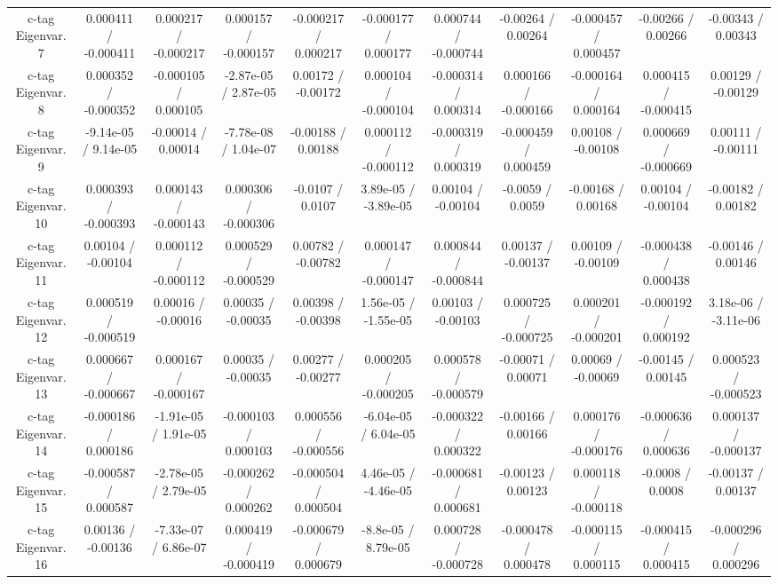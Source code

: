 {\begin{landscape}
\begin{longtable}{@{\extracolsep{\fill}}| *{11}{c|}}
  c-tag Eigenvar. 7 & 0.000411 / -0.000411 & 0.000217 / -0.000217 & 0.000157 / -0.000157 & -0.000217 / 0.000217 & -0.000177 / 0.000177 & 0.000744 / -0.000744 & -0.00264 / 0.00264 & -0.000457 / 0.000457 & -0.00266 / 0.00266 & -0.00343 / 0.00343 \\ 
  c-tag Eigenvar. 8 & 0.000352 / -0.000352 & -0.000105 / 0.000105 & -2.87e-05 / 2.87e-05 & 0.00172 / -0.00172 & 0.000104 / -0.000104 & -0.000314 / 0.000314 & 0.000166 / -0.000166 & -0.000164 / 0.000164 & 0.000415 / -0.000415 & 0.00129 / -0.00129 \\ 
  c-tag Eigenvar. 9 & -9.14e-05 / 9.14e-05 & -0.00014 / 0.00014 & -7.78e-08 / 1.04e-07 & -0.00188 / 0.00188 & 0.000112 / -0.000112 & -0.000319 / 0.000319 & -0.000459 / 0.000459 & 0.00108 / -0.00108 & 0.000669 / -0.000669 & 0.00111 / -0.00111 \\ 
  c-tag Eigenvar. 10 & 0.000393 / -0.000393 & 0.000143 / -0.000143 & 0.000306 / -0.000306 & -0.0107 / 0.0107 & 3.89e-05 / -3.89e-05 & 0.00104 / -0.00104 & -0.0059 / 0.0059 & -0.00168 / 0.00168 & 0.00104 / -0.00104 & -0.00182 / 0.00182 \\ 
  c-tag Eigenvar. 11 & 0.00104 / -0.00104 & 0.000112 / -0.000112 & 0.000529 / -0.000529 & 0.00782 / -0.00782 & 0.000147 / -0.000147 & 0.000844 / -0.000844 & 0.00137 / -0.00137 & 0.00109 / -0.00109 & -0.000438 / 0.000438 & -0.00146 / 0.00146 \\ 
  c-tag Eigenvar. 12 & 0.000519 / -0.000519 & 0.00016 / -0.00016 & 0.00035 / -0.00035 & 0.00398 / -0.00398 & 1.56e-05 / -1.55e-05 & 0.00103 / -0.00103 & 0.000725 / -0.000725 & 0.000201 / -0.000201 & -0.000192 / 0.000192 & 3.18e-06 / -3.11e-06 \\ 
  c-tag Eigenvar. 13 & 0.000667 / -0.000667 & 0.000167 / -0.000167 & 0.00035 / -0.00035 & 0.00277 / -0.00277 & 0.000205 / -0.000205 & 0.000578 / -0.000579 & -0.00071 / 0.00071 & 0.00069 / -0.00069 & -0.00145 / 0.00145 & 0.000523 / -0.000523 \\ 
  c-tag Eigenvar. 14 & -0.000186 / 0.000186 & -1.91e-05 / 1.91e-05 & -0.000103 / 0.000103 & 0.000556 / -0.000556 & -6.04e-05 / 6.04e-05 & -0.000322 / 0.000322 & -0.00166 / 0.00166 & 0.000176 / -0.000176 & -0.000636 / 0.000636 & 0.000137 / -0.000137 \\ 
  c-tag Eigenvar. 15 & -0.000587 / 0.000587 & -2.78e-05 / 2.79e-05 & -0.000262 / 0.000262 & -0.000504 / 0.000504 & 4.46e-05 / -4.46e-05 & -0.000681 / 0.000681 & -0.00123 / 0.00123 & 0.000118 / -0.000118 & -0.0008 / 0.0008 & -0.00137 / 0.00137 \\ 
  c-tag Eigenvar. 16 & 0.00136 / -0.00136 & -7.33e-07 / 6.86e-07 & 0.000419 / -0.000419 & -0.000679 / 0.000679 & -8.8e-05 / 8.79e-05 & 0.000728 / -0.000728 & -0.000478 / 0.000478 & -0.000115 / 0.000115 & -0.000415 / 0.000415 & -0.000296 / 0.000296 \\ 

\end{longtable}
\end{landscape}}
